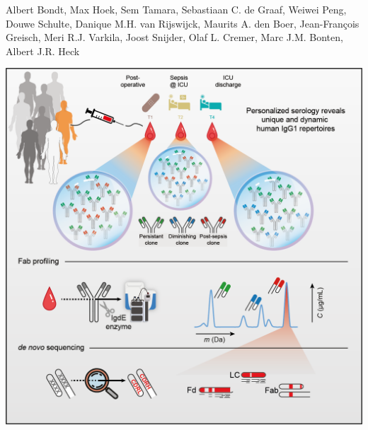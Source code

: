  \label{ch-3}
\vspace*{0.25cm}

{\footnotesize Albert Bondt, Max Hoek, Sem Tamara, Sebastiaan C. de Graaf, Weiwei Peng, Douwe Schulte, Danique M.H. van Rijswijck, Maurits A. den Boer, Jean-François Greisch, Meri R.J. Varkila, Joost Snijder, Olaf L. Cremer, Marc J.M. Bonten, Albert J.R. Heck}

\begin{center}
  \vspace{1cm}
  \includegraphics[]{Chapter.3/Figures/ch3a.png}
  \vspace{0.25cm}
\end{center}

